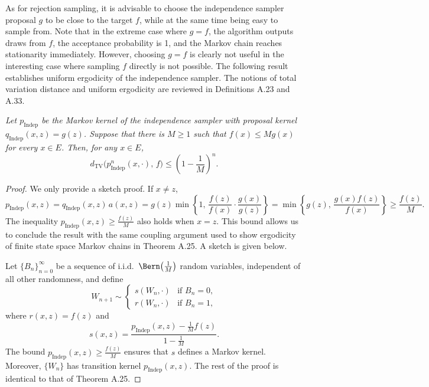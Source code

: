 As for rejection sampling, it is advisable to choose the independence sampler proposal $g$ to be
close to the target $f$, while at the same time being easy to sample from. Note that in the extreme
case where $g = f$, the algorithm outputs draws from $f$, the acceptance probability is 1, and the
Markov chain reaches stationarity immediately. However, choosing $g = f$ is clearly not useful
in the interesting case where sampling $f$ directly is not possible. The following result establishes
uniform ergodicity of the independence sampler. The notions of total variation distance and
uniform ergodicity are reviewed in Definitions A.23 and A.33.

\begin{theorem}
\label{thm:4.5}
\textit{Let $p_{\mathrm{Indep}}$ be the Markov kernel
of the independence sampler with proposal kernel $q_{\mathrm{Indep}}(x, z) = g(z)$. Suppose that there is
$M \geq 1$ such that $f(x) \leq Mg(x)$ for every $x \in E$. Then, for any $x \in E$,}
\[
  d_{\mathrm{TV}}\!\bigl(p_{\mathrm{Indep}}^n(x, \cdot),\, f\bigr)
  \leq \left(1 - \frac{1}{M}\right)^n.
\]
\end{theorem}

\begin{proof}
We only provide a sketch proof. If $x \neq z$,
\[
  p_{\mathrm{Indep}}(x, z)
  = q_{\mathrm{Indep}}(x, z)\, a(x, z)
  = g(z)\min\!\left\{1,\, \frac{f(z)}{f(x)} \cdot \frac{g(x)}{g(z)}\right\}
  = \min\!\left\{g(z),\, \frac{g(x) f(z)}{f(x)}\right\}
  \geq \frac{f(z)}{M}.
\]
The inequality $p_{\mathrm{Indep}}(x, z) \geq \frac{f(z)}{M}$ also holds when $x = z$. This bound allows us to conclude
the result with the same coupling argument used to show ergodicity of finite state space Markov
chains in Theorem A.25. A sketch is given below.

Let $\{B_n\}_{n=0}^\infty$ be a sequence of i.i.d.\ $\Bern\!\left(\frac{1}{M}\right)$ random variables, independent of all
other randomness, and define
\[
  W_{n+1} \sim
  \begin{cases}
    s(W_n, \cdot) & \text{if } B_n = 0,\\
    r(W_n, \cdot) & \text{if } B_n = 1,
  \end{cases}
\]
where $r(x, z) = f(z)$ and
\[
  s(x, z) = \frac{p_{\mathrm{Indep}}(x, z) - \frac{1}{M} f(z)}{1 - \frac{1}{M}}.
\]
The bound $p_{\mathrm{Indep}}(x,z) \geq \frac{f(z)}{M}$ ensures that $s$ defines a Markov kernel. Moreover, $\{W_n\}$ has
transition kernel $p_{\mathrm{Indep}}(x, z)$. The rest of the proof is identical to that of Theorem A.25.
\end{proof}

